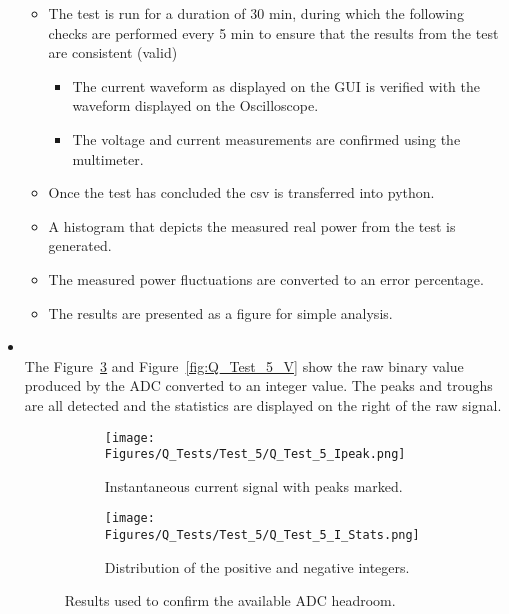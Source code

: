 \begin{itemize}
\begin{itemize}
        \item [Step 3:] The test is run for a duration of 30 min, during which the following checks are performed every 5 min to ensure that the results from the test are consistent (valid)
        \begin{itemize}
            \item The current waveform as displayed on the GUI is verified with the waveform displayed on the Oscilloscope.
            \item The voltage and current measurements are confirmed using the multimeter. 
        \end{itemize}
        \item[Step 4:] Once the test has concluded the csv is transferred into python.
        \item[Step 5:] A histogram that depicts the measured real power from the test is generated.
        \item[Step 6:] The measured power fluctuations are converted to an error percentage.
        \item[Step 7:] The results are presented as a figure for simple analysis.
    \end{itemize}
    \item [\emph{Results or measurements}]\mbox{}\\
    The Figure~\ref{fig:Q_Test_5_I} and Figure~\ref{fig:Q_Test_5_V} show the raw binary value produced by the ADC converted to an integer value. The peaks and troughs are all detected and the statistics are displayed on the right of the raw signal. 
    \begin{figure}[H]
     \centering
     \begin{subfigure}[b]{0.495\textwidth}
        \centering
        \texttt{[image: Figures/Q\_Tests/Test\_5/Q\_Test\_5\_Ipeak.png]}
        \caption{Instantaneous current signal with peaks marked.}
        \label{fig:Q_Test_5_I_peak}
     \end{subfigure}
     \hfill
     \begin{subfigure}[b]{0.495\textwidth}
        \centering
        \texttt{[image: Figures/Q\_Tests/Test\_5/Q\_Test\_5\_I\_Stats.png]}
        \caption{Distribution of the positive and negative integers.}
        \label{fig:Q_Test_5_I_Stats}
     \end{subfigure}
        \caption{Results used to confirm the available ADC headroom.}
        \label{fig:Q_Test_5_I}
    \end{figure}


\end{itemize}
